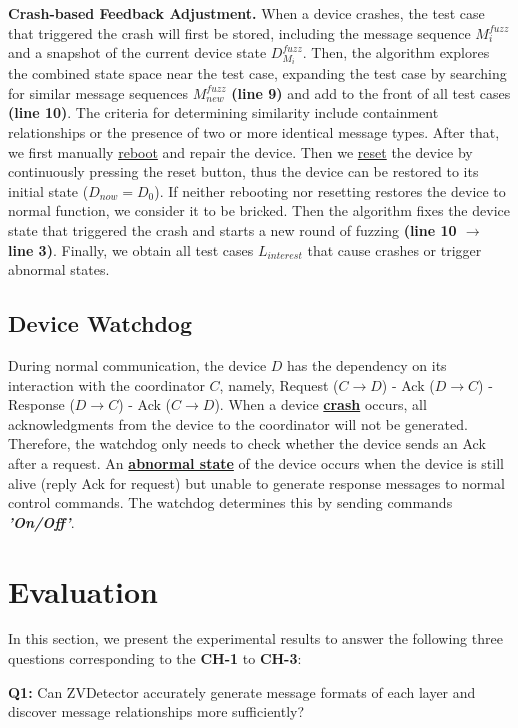 \documentclass[10pt,journal,compsoc]{IEEEtran}
\begin{document}
\textbf{Crash-based Feedback Adjustment.} When a device crashes, the test case that triggered the crash will first be stored, including the message sequence $M_i^{fuzz}$ and a snapshot of the current device state $D_{M_i}^{fuzz}$. Then, the algorithm explores the combined state space near the test case, expanding the test case by searching for similar message sequences $M_{new}^{fuzz}$ \textbf{(line 9)} and add to the front of all test cases \textbf{(line 10)}. The criteria for determining similarity include containment relationships or the presence of two or more identical message types. After that, we first manually \underline{reboot} and repair the device. Then we \underline{reset} the device by continuously pressing the reset button, thus the device can be restored to its initial state ($D_{now} = D_{0}$). If neither rebooting nor resetting restores the device to normal function, we consider it to be bricked. Then the algorithm fixes the device state that triggered the crash and starts a new round of fuzzing \textbf{(line 10 $\rightarrow$ line 3)}. Finally, we obtain all test cases $L_{interest}$ that cause crashes or trigger abnormal states. 

\subsection{Device Watchdog} \label{6-2}
During normal communication, the device $D$ has the dependency on its interaction with the coordinator $C$, namely, Request ($C \rightarrow D$) - Ack ($D \rightarrow C$) - Response ($D \rightarrow C$) - Ack ($C \rightarrow D$). When a device \underline{\textbf{crash}} occurs, all acknowledgments from the device to the coordinator will not be generated. Therefore, the watchdog only needs to check whether the device sends an Ack after a request. An \underline{\textbf{abnormal state}} of the device occurs when the device is still alive (reply Ack for request) but unable to generate response messages to normal control commands. The watchdog determines this by sending commands \textbf{\emph{'On/Off'}}.

\section{Evaluation}

In this section, we present the experimental results to answer the following three questions corresponding to the \textbf{CH-1} to \textbf{CH-3}:

\textbf{Q1:} Can ZVDetector accurately generate message formats of each layer and discover message relationships more sufficiently?
\end{document}
